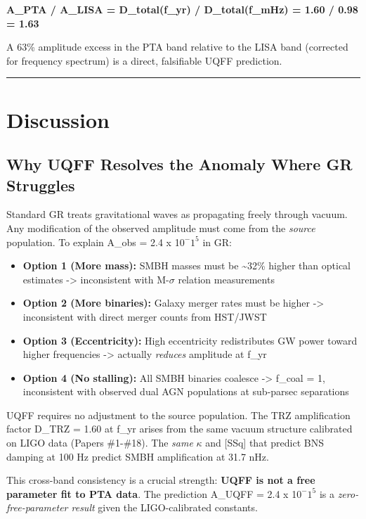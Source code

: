 \documentclass[12pt,a4paper]{article}
\begin{document}
\textbf{A\_PTA / A\_LISA = D\_total(f\_yr) / D\_total(f\_mHz) = 1.60 / 0.98 = 1.63}

A 63\% amplitude excess in the PTA band relative to the LISA band (corrected for frequency spectrum) is a direct, falsifiable UQFF prediction.

\medskip\hrule\medskip

\section{Discussion}

\subsection{Why UQFF Resolves the Anomaly Where GR Struggles}

Standard GR treats gravitational waves as propagating freely through vacuum. Any modification of the observed amplitude must come from the \emph{source} population. To explain A\_obs = 2.4 x 1$0^{-}$$1^{5}$ in GR:

\begin{itemize}
  \item \textbf{Option 1 (More mass):} SMBH masses must be \textasciitilde{}32\% higher than optical estimates -> inconsistent with M-$\sigma$ relation measurements
  \item \textbf{Option 2 (More binaries):} Galaxy merger rates must be higher -> inconsistent with direct merger counts from HST/JWST
  \item \textbf{Option 3 (Eccentricity):} High eccentricity redistributes GW power toward higher frequencies -> actually \emph{reduces} amplitude at f\_yr
  \item \textbf{Option 4 (No stalling):} All SMBH binaries coalesce -> f\_coal = 1, inconsistent with observed dual AGN populations at sub-parsec separations
\end{itemize}

UQFF requires no adjustment to the source population. The TRZ amplification factor D\_TRZ = 1.60 at f\_yr arises from the same vacuum structure calibrated on LIGO data (Papers \#1-\#18). The \emph{same} $\kappa$ and [SSq] that predict BNS damping at 100 Hz predict SMBH amplification at 31.7 nHz.

This cross-band consistency is a crucial strength: \textbf{UQFF is not a free parameter fit to PTA data}. The prediction A\_UQFF = 2.4 x 1$0^{-}$$1^{5}$ is a \emph{zero-free-parameter result} given the LIGO-calibrated constants.
\end{document}
